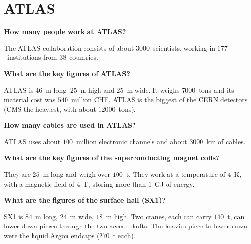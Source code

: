 \documentclass{atlasnote}
\newenvironment{question} %
{\noindent\bfseries}
{\par}
\newenvironment{answer} %
{}
{\vspace*{10pt}}
\newenvironment{faq} %
{\par\noindent\begin{minipage}{\linewidth}}
    {\end{minipage}\par}
\begin{document}
\section{ATLAS}

\begin{faq}
    \begin{question}
        How many people work at ATLAS?
    \end{question}
    \begin{answer}
        The ATLAS collaboration consists of about $3000$~scientists, working in $177$~institutions from $38$~countries.
    \end{answer}
\end{faq}

\begin{faq}
    \begin{question}
        What are the key figures of ATLAS?
    \end{question}
    \begin{answer}
        ATLAS is $46$~m long, $25$~m high and $25$~m wide. It weighs $7000$~tons and its material cost was $540$~million CHF. ATLAS is the biggest of the
        CERN detectors (CMS the heaviest, with about $12000$~tons).
    \end{answer}
\end{faq}

\begin{faq}
    \begin{question}
        How many cables are used in ATLAS?
    \end{question}
    \begin{answer}
        ATLAS uses about $100$~million electronic channels and about $3000$~km of cables.
    \end{answer}
\end{faq}

\begin{faq}
    \begin{question}
        What are the key figures of the superconducting magnet coils?
    \end{question}
    \begin{answer}
        They are $25$~m long and weigh over $100$~t. They work at a temperature of $4$~K, with a magnetic field of $4$~T, storing more than $1$~GJ of energy.
    \end{answer}
\end{faq}

\begin{faq}
    \begin{question}
        What are the figures of the surface hall (SX1)?
    \end{question}
    \begin{answer}
        SX1 is $84$~m long, $24$~m wide, $18$~m high. Two cranes, each can carry $140$~t, can lower down pieces through the two access shafts. The heavies
        piece to lower down were the liquid Argon endcaps ($270$~t each).
    \end{answer}
\end{faq}
\end{document}
